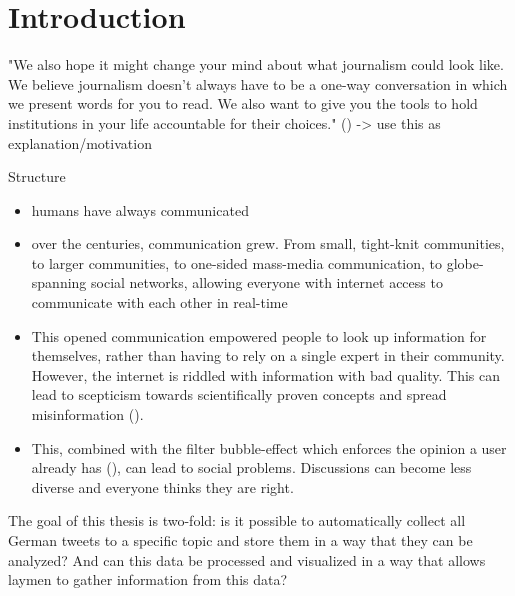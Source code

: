 \section{Introduction}
"We also hope it might change your mind about what journalism could look like. We believe journalism doesn’t always have to be a one-way conversation in which we present words for you to read. We also want to give you the tools to hold institutions in your life accountable for their choices." (\cite{angwinMakingPrivacyPersonal2020}) -> use this as explanation/motivation

Structure
\begin{itemize}
    \item humans have always communicated
    \item over the centuries, communication grew. From small, tight-knit communities, to larger communities, to one-sided mass-media communication, to globe-spanning social networks, allowing everyone with internet access to communicate with each other in real-time
    \item This opened communication empowered people to look up information for themselves, rather than having to rely on a single expert in their community. However, the internet is riddled with information with bad quality. This can lead to scepticism towards scientifically proven concepts and spread misinformation (\cite{krimskyRiskCommunicationInternet2007}).
    \item This, combined with the filter bubble-effect which enforces the opinion a user already has (\cite{pariser2011filter}), can lead to social problems. Discussions can become less diverse and everyone thinks they are right.
\end{itemize}

The goal of this thesis is two-fold: is it possible to automatically collect all German tweets to a specific topic and store them in a way that they can be analyzed? And can this data be processed and visualized in a way that allows laymen to gather information from this data?